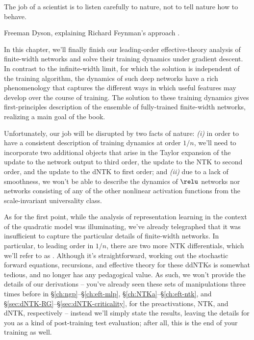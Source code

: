 
\label{ch:eot}

\epigraph{The job of a scientist is to listen carefully to nature, not to tell nature how to behave.}{Freeman Dyson, explaining Richard Feynman's approach %
\cite{feynman2006classic}.}



\noindent{}In this chapter, we'll finally finish our leading-order effective-theory analysis 
of finite-width networks and solve their training dynamics under gradient descent.
In contrast to the infinite-width limit, for which the solution is independent of the training algorithm,  the dynamics of such deep networks have a rich phenomenology that captures the different ways in which useful features may develop over the course of training.
The solution to these training dynamics  gives first-principles description of the ensemble of fully-trained finite-width networks, realizing a main goal of the book.




Unfortunately, our job will be disrupted by two facts of nature: \emph{(i)} in order to have a consistent description of training dynamics at order $1/n$, we'll need to incorporate two additional objects that arise in the Taylor expansion
of the update to the network output to third order, the update to the NTK to second order, and the update to the dNTK to first order; and 
\emph{(ii)} due to a lack of smoothness, we won't be able to describe the dynamics of $\relu$ networks nor networks consisting of any of the other nonlinear activation functions from the scale-invariant universality class.




As for the first
point,
while the analysis of representation learning in the context of the quadratic model was illuminating,
we've already telegraphed that it was insufficient to capture the particular details of finite-width networks. In particular, 
to leading order in $1/n$, there are two more NTK differentials, which we'll refer to as .
Although it's straightforward, working out the stochastic forward equations, recursions, and effective theory for these ddNTKs is somewhat tedious, and no longer has any pedagogical value. As such, we won't provide the details of our derivations -- you've already seen these sets of manipulations three times before in \S\ref{ch:ngp}--\S\ref{ch:eft-mlp}, \S\ref{ch:NTKa}--\S\ref{ch:eft-ntk}, and \S\ref{sec:dNTK-RG}--\S\ref{sec:dNTK-criticality}, for the preactivations, NTK, and dNTK, respectively -- instead we'll simply state the results, leaving the details for you as a kind of post-training test evaluation; after all, this is the end of your training as well.



